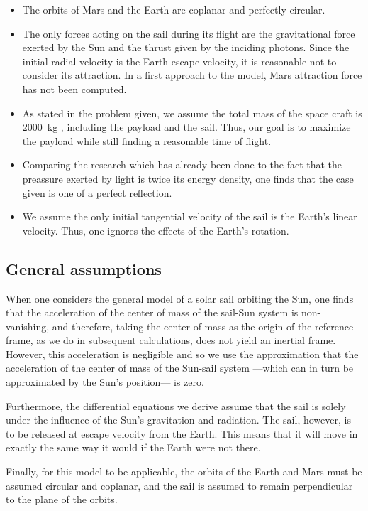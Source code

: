 \documentclass[twocolumn,12pt,a4paper]{article}
\numberwithin{equation}{section}
\begin{document}
\begin{itemize}
\item The orbits of Mars and the Earth are coplanar and perfectly circular.
\item The only forces acting on the sail during its flight are the gravitational force exerted by the Sun and the thrust given by the inciding photons. Since the initial radial velocity is the Earth escape velocity, it is reasonable not to consider its attraction. In a first approach to the model, Mars attraction force has not been computed.
\item As stated in the problem given, we assume the total mass of the space craft is \SI{2 000}{kg} , including the payload and the sail. Thus, our goal is to maximize the payload while still finding a reasonable time of flight. 
\item Comparing the research which has already been done to the fact that the preassure exerted by light is twice its energy density, one finds that the case given is one of a perfect reflection.
\item We assume the only initial tangential velocity of the sail is the Earth's linear velocity. Thus, one ignores the effects of the Earth's rotation.
\end{itemize}

\subsection{General assumptions}
When one considers the general model of a solar sail orbiting the Sun, one finds that the acceleration of the center of mass of the sail-Sun system is non-vanishing, and therefore, taking the center of mass as the origin of the reference frame, as we do in subsequent calculations, does not yield an inertial frame. However, this acceleration is negligible and so we use the approximation that the acceleration of the center of mass of the Sun-sail system ---which can in turn be approximated by the Sun's position--- is zero.

Furthermore, the differential equations we derive assume that the sail is solely under the influence of the Sun's gravitation and radiation. The sail, however, is to be released at escape velocity from the Earth. This means that it will move in exactly the same way it would if the Earth were not there. 

Finally, for this model to be applicable, the orbits of the Earth and Mars must be assumed circular and coplanar, and the sail is assumed to remain perpendicular to the plane of the orbits.
\end{document}

